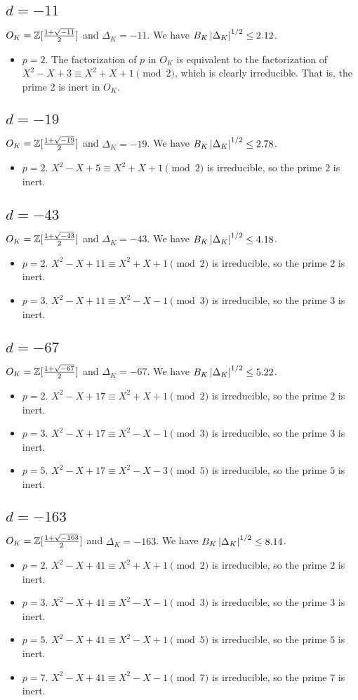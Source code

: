 \documentclass{article}
\newcommand{\csd}[1]{\subsection{\texorpdfstring{$d=-#1$}{d=-#1}}\indent}
\begin{document}
\csd{11}

$O_K=\mathbb{Z}[\frac{1+\sqrt{-11}}{2}]$ and $\Delta_K=-11$. We have $B_K\left\vert\Delta_K\right\vert^{1/2}\leq 2.12$.

\begin{itemize}
    \item $p=2$. The factorization of $p$ in $O_K$ is equivalent to the factorization of $X^2-X+3\equiv X^2+X+1\pmod{2}$, which is clearly irreducible. That is, the prime $2$ is inert in $O_K$.
\end{itemize}

\csd{19}

$O_K=\mathbb{Z}[\frac{1+\sqrt{-19}}{2}]$ and $\Delta_K=-19$. We have $B_K\left\vert\Delta_K\right\vert^{1/2}\leq 2.78$.

\begin{itemize}
    \item $p=2$. $X^2-X+5\equiv X^2+X+1\pmod{2}$ is irreducible, so the prime $2$ is inert.
\end{itemize}

\csd{43}

$O_K=\mathbb{Z}[\frac{1+\sqrt{-43}}{2}]$ and $\Delta_K=-43$. We have $B_K\left\vert\Delta_K\right\vert^{1/2}\leq 4.18$.

\begin{itemize}
    \item $p=2$. $X^2-X+11\equiv X^2+X+1\pmod{2}$ is irreducible, so the prime $2$ is inert.
    \item $p=3$. $X^2-X+11\equiv X^2-X-1\pmod{3}$ is irreducible, so the prime $3$ is inert.
\end{itemize}

\csd{67}

$O_K=\mathbb{Z}[\frac{1+\sqrt{-67}}{2}]$ and $\Delta_K=-67$. We have $B_K\left\vert\Delta_K\right\vert^{1/2}\leq 5.22$.

\begin{itemize}
    \item $p=2$. $X^2-X+17\equiv X^2+X+1\pmod{2}$ is irreducible, so the prime $2$ is inert.
    \item $p=3$. $X^2-X+17\equiv X^2-X-1\pmod{3}$ is irreducible, so the prime $3$ is inert.
    \item $p=5$. $X^2-X+17\equiv X^2-X-3\pmod{5}$ is irreducible, so the prime $5$ is inert.
\end{itemize}

\csd{163}

$O_K=\mathbb{Z}[\frac{1+\sqrt{-163}}{2}]$ and $\Delta_K=-163$. We have $B_K\left\vert\Delta_K\right\vert^{1/2}\leq 8.14$.

\begin{itemize}
    \item $p=2$. $X^2-X+41\equiv X^2+X+1\pmod{2}$ is irreducible, so the prime $2$ is inert.
    \item $p=3$. $X^2-X+41\equiv X^2-X-1\pmod{3}$ is irreducible, so the prime $3$ is inert.
    \item $p=5$. $X^2-X+41\equiv X^2-X+1\pmod{5}$ is irreducible, so the prime $5$ is inert.
    \item $p=7$. $X^2-X+41\equiv X^2-X-1\pmod{7}$ is irreducible, so the prime $7$ is inert.
\end{itemize}
\end{document}
